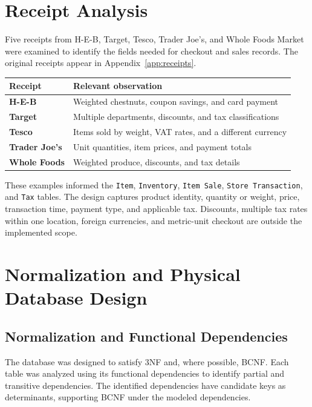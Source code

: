 \documentclass[11pt,letterpaper]{article}
\begin{document}
\section{Receipt Analysis}

Five receipts from H-E-B, Target, Tesco, Trader Joe's, and Whole Foods Market were examined to identify the fields needed for checkout and sales records. The original receipts appear in Appendix~\ref{app:receipts}.

\begin{center}
\small
\begin{tabularx}{\textwidth}{@{}>{\bfseries}p{}X@{}}
\hline
Receipt & Relevant observation \\ \hline
H-E-B & Weighted chestnuts, coupon savings, and card payment \\
Target & Multiple departments, discounts, and tax classifications \\
Tesco & Items sold by weight, VAT rates, and a different currency \\
Trader Joe's & Unit quantities, item prices, and payment totals \\
Whole Foods & Weighted produce, discounts, and tax details \\ \hline
\end{tabularx}
\end{center}

These examples informed the \texttt{Item}, \texttt{Inventory}, \texttt{Item Sale}, \texttt{Store Transaction}, and \texttt{Tax} tables. The design captures product identity, quantity or weight, price, transaction time, payment type, and applicable tax. Discounts, multiple tax rates within one location, foreign currencies, and metric-unit checkout are outside the implemented scope.

\section{Normalization and Physical Database Design}

\subsection{Normalization and Functional Dependencies}

The database was designed to satisfy 3NF and, where possible, BCNF. Each table was analyzed using its functional dependencies to identify partial and transitive dependencies. The identified dependencies have candidate keys as determinants, supporting BCNF under the modeled dependencies.
\end{document}
